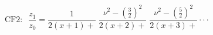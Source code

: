 \documentclass[12pt]{article}
\begin{document}
\begin{displaymath}
\textrm{CF2}:\;\;
\frac{z_1}{z_0} = \frac{1}{2(x+1) +} \;
    \frac{\nu^2-\left(\frac{3}{2}\right)^2}{2(x+2) +} \;
    \frac{\nu^2-\left(\frac{5}{2}\right)^2}{2(x+3) +} \cdot\cdot\cdot
\end{displaymath}
\end{document}
